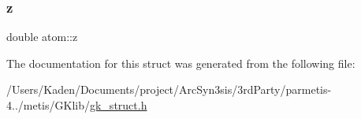 \mbox{\label{a00658_ac42f4b22143f6cda6bd26bfa01896a65}} 
\subsubsection{\texorpdfstring{z}{z}}
{\footnotesize\ttfamily double atom\+::z}



The documentation for this struct was generated from the following file\+:\begin{DoxyCompactItemize}
\item 
/\+Users/\+Kaden/\+Documents/project/\+Arc\+Syn3sis/3rd\+Party/parmetis-\/4../metis/\+G\+Klib/\hyperlink{a00080}{gk\+\_\+struct.\+h}\end{DoxyCompactItemize}
